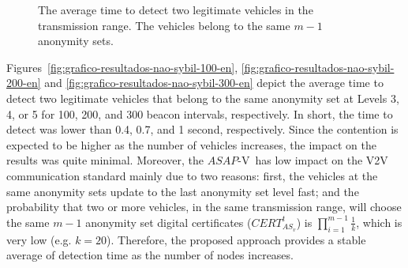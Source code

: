\documentclass[preprint,12pt]{elsarticle}
\newcommand{\protocolname}{$ASAP$-V}
\begin{document}
\begin{figure}[H]
\caption{\footnotesize{The average time to detect two legitimate vehicles in the transmission range. The vehicles belong to the same $m - 1$ anonymity sets.}}
\label{fig:resultados-nao-sybil}
\end{figure}

Figures~\ref{fig:grafico-resultados-nao-sybil-100-en}, \ref{fig:grafico-resultados-nao-sybil-200-en} and \ref{fig:grafico-resultados-nao-sybil-300-en} depict the average time to detect two legitimate vehicles that belong to the same anonymity set at Levels 3, 4, or 5 for 100, 200, and 300 beacon intervals, respectively. In short, the time to detect was lower than 0.4, 0.7, and 1 second, respectively. Since the contention is expected to be higher as the number of vehicles increases, the impact on the results was quite minimal. Moreover, the \protocolname~has low impact on the V2V communication standard mainly due to two reasons: first, the vehicles at the same anonymity sets update to the last anonymity set level fast; and the probability that two or more vehicles, in the same transmission range, will choose the same $m-1$ anonymity set digital certificates ($CERT^{t}_{AS_{v}}$) is ${\displaystyle \prod_{i=1}^{m-1}  \frac{1}{k}}$, which is very low (e.g. $k = 20$). Therefore, the proposed approach provides a stable average of detection time as the number of nodes increases.
\end{document}
